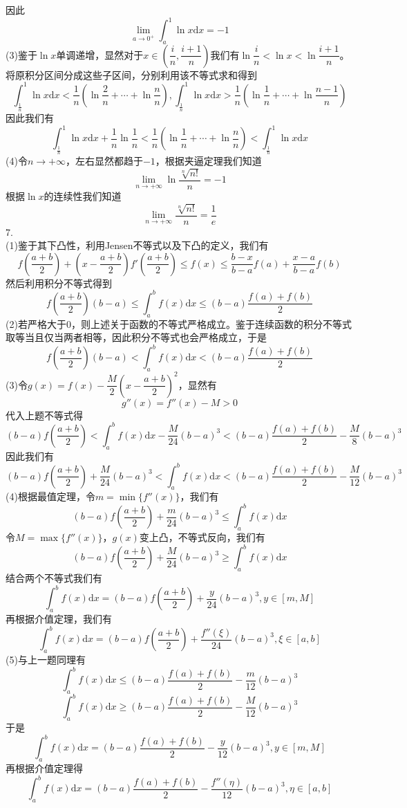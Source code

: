 \documentclass[utf8]{ctexart}
\begin{document}
因此
\[\lim_{a\rightarrow0^+}\int_{a}^{1}\ln x\mathrm{d}x=-1\]
(3)鉴于$\ln x$单调递增，显然对于$x\in(\dfrac{i}{n},\dfrac{i+1}{n})$我们有$\ln\dfrac{i}{n}<\ln x<\ln\dfrac{i+1}{n}$。将原积分区间分成这些子区间，分别利用该不等式求和得到
\[\int_{\frac{1}{n}}^{1}\ln x\mathrm{d}x<\frac{1}{n}(\ln\frac{2}{n}+\cdots+\ln\frac{n}{n}),\int_{\frac{1}{n}}^{1}\ln x\mathrm{d}x>\frac{1}{n}(\ln\frac{1}{n}+\cdots+\ln\frac{n-1}{n})\]
因此我们有
\[\int_{\frac{1}{n}}^{1}\ln x\mathrm{d}x+\frac{1}{n}\ln\frac{1}{n}<\frac{1}{n}(\ln\frac{1}{n}+\cdots+\ln\frac{n}{n})<\int_{\frac{1}{n}}^{1}\ln x\mathrm{d}x\]
(4)令$n\rightarrow+\infty$，左右显然都趋于$-1$，根据夹逼定理我们知道
\[\lim_{n\rightarrow+\infty}\ln\frac{\sqrt[n]{n!}}{n}=-1\]
根据$\ln x$的连续性我们知道
\[\lim_{n\rightarrow+\infty}\frac{\sqrt[n]{n!}}{n}=\frac{1}{e}\]
7.\\
(1)鉴于其下凸性，利用Jensen不等式以及下凸的定义，我们有
\[f(\frac{a+b}{2})+(x-\frac{a+b}{2})f'(\frac{a+b}{2})\le f(x)\le\frac{b-x}{b-a}f(a)+\frac{x-a}{b-a}f(b)\]
然后利用积分不等式得到
\[f(\frac{a+b}{2})(b-a)\le\int_{a}^{b}f(x)\mathrm{d}x\le(b-a)\frac{f(a)+f(b)}{2}\]
(2)若严格大于$0$，则上述关于函数的不等式严格成立。鉴于连续函数的积分不等式取等当且仅当两者相等，因此积分不等式也会严格成立，于是
\[f(\frac{a+b}{2})(b-a)<\int_{a}^{b}f(x)\mathrm{d}x<(b-a)\frac{f(a)+f(b)}{2}\]
(3)令$g(x)=f(x)-\dfrac{M}{2}(x-\dfrac{a+b}{2})^2$，显然有
\[g''(x)=f''(x)-M>0\]
代入上题不等式得
\[(b-a)f(\frac{a+b}{2})<\int_{a}^{b}f(x)\mathrm{d}x-\frac{M}{24}(b-a)^3<(b-a)\frac{f(a)+f(b)}{2}-\frac{M}{8}(b-a)^3\]
因此我们有
\[(b-a)f(\frac{a+b}{2})+\frac{M}{24}(b-a)^3<\int_{a}^{b}f(x)\mathrm{d}x<(b-a)\frac{f(a)+f(b)}{2}-\frac{M}{12}(b-a)^3\]
(4)根据最值定理，令$m=\min\{f''(x)\}$，我们有
\[(b-a)f(\frac{a+b}{2})+\frac{m}{24}(b-a)^3\le\int_{a}^{b}f(x)\mathrm{d}x\]
令$M=\max\{f''(x)\}$，$g(x)$变上凸，不等式反向，我们有
\[(b-a)f(\frac{a+b}{2})+\frac{M}{24}(b-a)^3\ge\int_{a}^{b}f(x)\mathrm{d}x\]
结合两个不等式我们有
\[\int_{a}^{b}f(x)\mathrm{d}x=(b-a)f(\frac{a+b}{2})+\frac{y}{24}(b-a)^3,y\in[m,M]\]
再根据介值定理，我们有
\[\int_{a}^{b}f(x)\mathrm{d}x=(b-a)f(\frac{a+b}{2})+\frac{f''(\xi)}{24}(b-a)^3,\xi\in[a,b]\]
(5)与上一题同理有
\[\int_{a}^{b}f(x)\mathrm{d}x\le(b-a)\frac{f(a)+f(b)}{2}-\frac{m}{12}(b-a)^3\]
\[\int_{a}^{b}f(x)\mathrm{d}x\ge(b-a)\frac{f(a)+f(b)}{2}-\frac{M}{12}(b-a)^3\]
于是
\[\int_{a}^{b}f(x)\mathrm{d}x=(b-a)\frac{f(a)+f(b)}{2}-\frac{y}{12}(b-a)^3,y\in[m,M]\]
再根据介值定理得
\[\int_{a}^{b}f(x)\mathrm{d}x=(b-a)\frac{f(a)+f(b)}{2}-\frac{f''(\eta)}{12}(b-a)^3,\eta\in[a,b]\]
\end{document}

